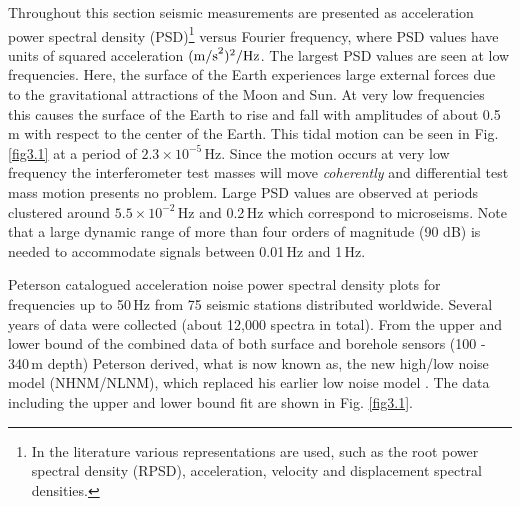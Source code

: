 Throughout this section seismic measurements are presented as acceleration power spectral density (PSD)\footnote{In the literature various representations are used, such as the root power spectral density (RPSD), acceleration, velocity and displacement spectral densities.} versus Fourier frequency, where PSD values have units of squared acceleration $({\rm m/s}^2)^2/{\rm Hz}$. The largest PSD values are seen at low frequencies. Here, the surface of the Earth experiences large external forces due to the gravitational attractions of the Moon and Sun. At very low frequencies this causes the surface of the Earth to rise and fall with amplitudes of about 0.5\,m with respect to the center of the Earth. This tidal motion can be seen in Fig. \ref{fig3.1} at a period of $2.3 \times 10^{-5}$\,Hz. Since the motion occurs at very low frequency the interferometer test masses will move {\sl coherently} and differential test mass motion presents no problem. Large PSD values are observed at periods clustered around $5.5 \times 10^{-2}$\,Hz and 0.2\,Hz which correspond to microseisms. Note that a large dynamic range of more than four orders of magnitude (90 dB) is needed to accommodate signals between 0.01\,Hz and 1\,Hz.

Peterson \cite{Peterson1993} catalogued acceleration noise power spectral density plots for frequencies up to 50\,Hz from 75 seismic stations distributed worldwide. Several years of data were collected (about 12,000 spectra in total). From the upper and lower bound of the combined data of both surface and borehole sensors (100 - 340\,m depth) Peterson derived, what is now known as, the new high/low noise model (NHNM/NLNM), which replaced his earlier low noise model \cite{Peterson1980}. The data including the upper and lower bound fit are shown in Fig. \ref{fig3.1}. 

